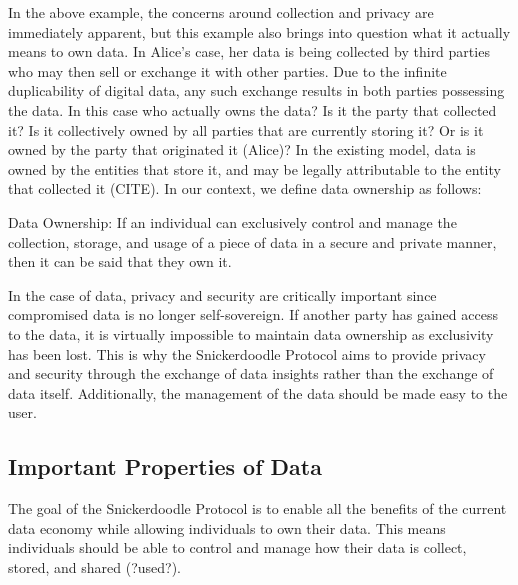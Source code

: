 In the above example, the concerns around collection and privacy are immediately apparent, but this example also brings into question what it actually means to own data. In Alice's case, her data is being collected by third parties who may then sell or exchange it with other parties. Due to the infinite duplicability of digital data, any such exchange results in both parties possessing the data. In this case who actually owns the data? Is it the party that collected it? Is it collectively owned by all parties that are currently storing it? Or is it owned by the party that originated it (Alice)? In the existing model, data is owned by the entities that store it, and may be legally attributable to the entity that collected it (CITE). In our context, we define data ownership as follows:

\begin{definition}
\label{definition:DataOwnership}
Data Ownership: If an individual can exclusively control and manage the collection, storage, and usage of a piece of data in a secure and private manner, then it can be said that they own it.
\end{definition}

In the case of data, privacy and security are critically important since compromised data is no longer self-sovereign. If another party has gained access to the data, it is virtually impossible to maintain data ownership as exclusivity has been lost. This is why the Snickerdoodle Protocol aims to provide privacy and security through the exchange of data insights rather than the exchange of data itself. Additionally, the management of the data should be made easy to the user.




\subsection{Important Properties of Data}
The goal of the Snickerdoodle Protocol is to enable all the benefits of the current data economy while allowing individuals to own their data. This means individuals should be able to control and manage how their data is collect, stored, and shared (?used?). 

